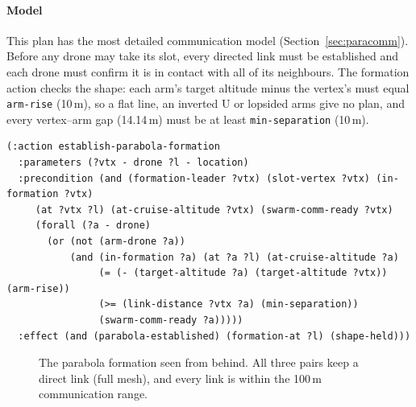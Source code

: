 \documentclass[11pt,a4paper,oneside]{report}
\newcommand{\code}[1]{\texttt{#1}}
\begin{document}
\paragraph{Model}
This plan has the most detailed communication model (Section~\ref{sec:paracomm}). Before any
drone may take its slot, every directed link must be established and each drone must confirm
it is in contact with all of its neighbours. The formation action checks the shape: each arm's
target altitude minus the vertex's must equal \code{arm-rise} (10\,m), so a flat line, an
inverted U or lopsided arms give no plan, and every vertex--arm gap (14.14\,m) must be at least
\code{min-separation} (10\,m).

\begin{lstlisting}
(:action establish-parabola-formation
  :parameters (?vtx - drone ?l - location)
  :precondition (and (formation-leader ?vtx) (slot-vertex ?vtx) (in-formation ?vtx)
     (at ?vtx ?l) (at-cruise-altitude ?vtx) (swarm-comm-ready ?vtx)
     (forall (?a - drone)
       (or (not (arm-drone ?a))
           (and (in-formation ?a) (at ?a ?l) (at-cruise-altitude ?a)
                (= (- (target-altitude ?a) (target-altitude ?vtx)) (arm-rise))
                (>= (link-distance ?vtx ?a) (min-separation))
                (swarm-comm-ready ?a)))))
  :effect (and (parabola-established) (formation-at ?l) (shape-held)))
\end{lstlisting}

\begin{figure}[H]
\centering
{}
\caption{The parabola formation seen from behind. All three pairs keep a direct link
(full mesh), and every link is within the 100\,m communication range.}
\label{fig:parabola}
\end{figure}
\end{document}
